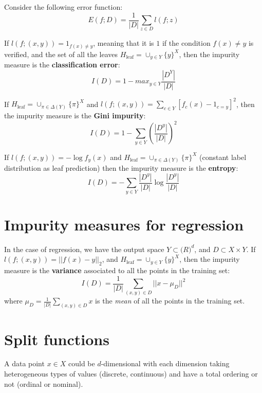 Consider the following error function:
\[E(f;D) = \frac 1 {|D|} \sum_{z \in D} l(f;z)\]

If \(l(f;(x,y)) = 1_{f(x) \neq y}\), meaning that it is \(1\) if the condition \(f(x) \neq y\) is verified, and the set of all the leaves \(H_\text{leaf} = \cup_{y \in Y} \{y\}^X\), then the impurity measure is the \textbf{classification error}:
\begin{equation}
    I(D) = 1 - max_{y\in Y} \frac {|D^Y|} {|D|}
\end{equation}

If \(H_\text{leaf} = \cup_{\pi \in \Delta(Y)} \{\pi\}^X\) and \(l(f;(x,y)) = \sum_{c \in Y} [f_c(x) - 1_{c=y}]^2\), then the impurity measure is the \textbf{Gini impurity}:
\begin{equation}
    I(D) = 1 - \sum_{y \in Y} \left( \frac {|D^y|} {|D|} \right) ^2
\end{equation}

If \(l(f;(x,y)) = -\log f_y(x)\) and \(H_\text{leaf} = \cup_{\pi \in \Delta(Y)} \{\pi\}^X\) (constant label distribution as leaf prediction) then the impurity measure is the \textbf{entropy}:
\begin{equation}
    I(D) = - \sum_{y \in Y} \frac {|D^y|} {|D|} \log \frac {|D^y|} {|D|}
\end{equation}

\section{Impurity measures for regression}
In the case of regression, we have the output space \(Y \subset \mathbb(R)^d\), and \(D \subset X \times Y\). If \(l(f;(x,y)) = ||f(x) - y||_2\), and \(H_\text{leaf}=\cup_{y \in Y} \{y\}^X\), then the impurity measure is the \textbf{variance} associated to all the points in the  training set:
\begin{equation}
    I(D) = \frac 1 {|D|} \sum_{(x,y) \in D} ||x - \mu_D||^2
\end{equation}
where \(\mu_D = \frac 1 {|D|} \sum_{(x,y) \in D} x\) is the \emph{mean} of all the points in the training set.

\section{Split functions}
A data point \(x \in X\) could be \(d\)-dimensional with each dimension taking heterogeneous types of values (discrete, continuous) and have a total ordering or not (ordinal or nominal).

